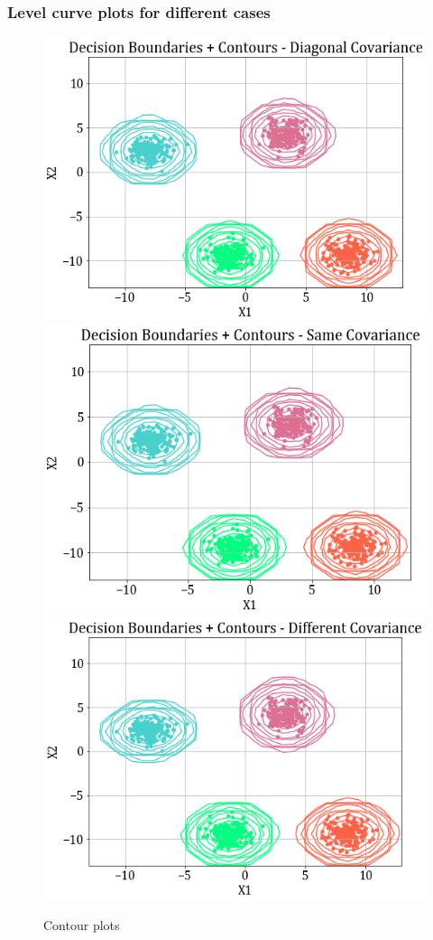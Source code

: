 \documentclass[11pt,a4paper]{article}
\begin{document}
\break
\subsubsection{Level curve plots for different cases}
\begin{figure}[H]
    \centering
    \includegraphics[scale=0.5]{images/1A/1A_contour_case1.png}
    \includegraphics[scale=0.5]{images/1A/1A_contour_case2.png}
    \includegraphics[scale=0.5]{images/1A/1A_contour_case3.png}
    \caption{Contour plots}
    \label{fig:cp_1}
\end{figure}
\end{document}
